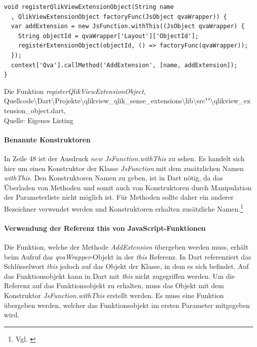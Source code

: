 \ifIncludeFigures\begin{listing}[htbp]
\begin{verbatim}
void registerQlikViewExtensionObject(String name
  , QlikViewExtensionObject factoryFunc(JsObject qvaWrapper)) {
  var addExtension = new JsFunction.withThis((JsObject qvaWrapper) {
    String objectId = qvaWrapper['Layout']['ObjectId'];
    registerExtensionObject(objectId, () => factoryFunc(qvaWrapper));
  });
  context['Qva'].callMethod('AddExtension', [name, addExtension]);
}
\end{verbatim}
\caption[Die Funktion \textit{registerQlikViewExtensionObject}]{Die Funktion \textit{registerQlikViewExtensionObject}, \\Quellcode\textbackslash{}Dart\textbackslash{}Projekte\textbackslash{}qlikview\_qlik\_sense\_extensions\textbackslash{}lib\textbackslash{}src""\textbackslash{}qlikview\_extension\_object.dart, \\Quelle: Eigenes Listing}
\label{lst:registerQlikViewExtensionObject}
\end{listing}\fi

\newpage
\paragraph{Benannte Konstruktoren} 
In Zeile 48 ist der Ausdruck \textit{new JsFunction.withThis} zu sehen. Es handelt sich hier um einen Konstruktor der Klasse \textit{JsFunction} mit dem zusätzlichen Namen \textit{withThis}. Den Konstruktoren Namen zu geben, ist in Dart nötig, da das Überladen von Methoden und somit auch von Konstruktoren durch Manipulation der Parameterliste nicht möglich ist. Für Methoden sollte daher ein anderer Bezeichner verwendet werden und Konstruktoren erhalten zusätzliche Namen.\footnote{Vgl. \cite[S. 133]{kopec2014dart}}

\paragraph{Verwendung der Referenz this von JavaScript-Funktionen}
Die Funktion, welche der Methode \textit{AddExtension} übergeben werden muss, erhält beim Aufruf das \textit{qvaWrapper}-Objekt in der \textit{this} Referenz. In Dart referenziert das Schlüssel\-wort \textit{this} jedoch auf das Objekt der Klasse, in dem es sich befindet. Auf das Funktionsobjekt kann in Dart mit \textit{this} nicht zugegriffen werden. Um die Referenz auf das Funktionsobjekt zu erhalten, muss das Objekt mit dem Konstruktor \textit{JsFunction.withThis} erstellt werden. Es muss eine Funktion übergeben werden, welcher das Funktionsobjekt im ersten Parameter mitgegeben wird.

